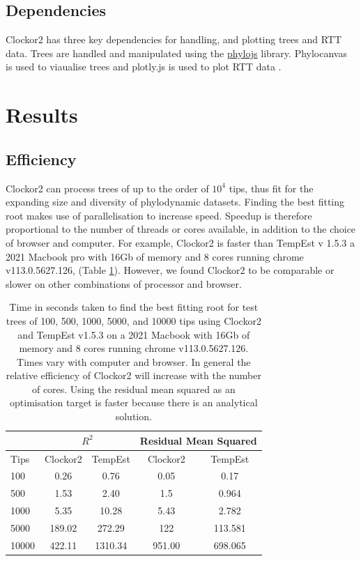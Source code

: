 \documentclass{article}
\begin{document}
\subsection*{Dependencies}
Clockor2 has three key dependencies for handling, and plotting trees and RTT data. Trees are handled and manipulated using the \href{https://github.com/clockor2/phylojs}{phylojs} library. Phylocanvas is used to viaualise trees and plotly.js is used to plot RTT data \citep{abudahab_phylocanvasgl_2021,plotly}.

\section*{Results}
\subsection*{Efficiency}
Clockor2 can process trees of up to the order of $10^4$ tips, thus fit for the expanding size and diversity of phylodynamic datasets. Finding the best fitting root makes use of parallelisation to increase speed. Speedup is therefore proportional to the number of threads or cores available, in addition to the choice of browser and computer. For example, Clockor2 is faster than TempEst v 1.5.3 a 2021 Macbook pro with 16Gb of memory and 8 cores running chrome v113.0.5627.126, (Table \ref{tab:bfr}). However, we found Clockor2 to be comparable or slower on other combinations of processor and browser. 
\begin{table}[H]
    \centering
    \caption{Time in seconds taken to find the best fitting root for test trees of 100, 500, 1000, 5000, and 10000 tips using Clockor2 and TempEst v1.5.3 on a 2021 Macbook with 16Gb of memory and 8 cores running chrome v113.0.5627.126. Times vary with computer and browser. In general the relative efficiency of Clockor2 will increase with the number of cores. Using the residual mean squared as an optimisation target is faster because there is an analytical solution.}
    \begin{tabular}{|l|c|c|c|c|}
    		\cline{2-5}
    		\multicolumn{1}{c}{}		 & \multicolumn{2}{|c|}{$R^{2}$} & \multicolumn{2}{|c|}{Residual Mean Squared}  \\
    		\hline
        Tips    & Clockor2  & TempEst & Clockor2  & TempEst   \\
        \hline
        100 & 0.26 & 0.76 & 0.05 & 0.17 \\
        500 & 1.53 & 2.40 & 1.5 & 0.964 \\
        1000 & 5.35 & 10.28 & 5.43 & 2.782 \\
        5000 & 189.02 & 272.29 & 122 & 113.581 \\
        10000 & 422.11 & 1310.34 & 951.00 & 698.065 \\
        \hline
    \end{tabular}
    \label{tab:bfr}
\end{table}
\end{document}
